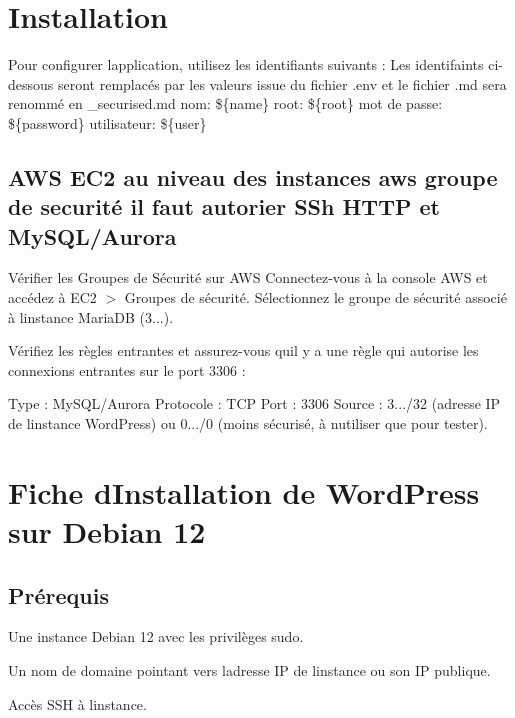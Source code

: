 \section*{Installation}

Pour configurer l\textquotesingle{}application, utilisez les identifiants suivants \+: Les identifaints ci-\/dessous seront remplacés par les valeurs issue du fichier .env et le fichier .md sera renommé en \+\_\+securised.\+md nom\+: \$\{name\} root\+: \$\{root\} mot de passe\+: \$\{password\} utilisateur\+: \$\{user\}

\subsection*{A\+WS E\+C2 au niveau des instances aws groupe de securité il faut autorier S\+Sh H\+T\+TP et My\+S\+Q\+L/\+Aurora}

Vérifier les Groupes de Sécurité sur A\+WS Connectez-\/vous à la console A\+WS et accédez à E\+C2 $>$ Groupes de sécurité. Sélectionnez le groupe de sécurité associé à l\textquotesingle{}instance Maria\+DB (3...).

Vérifiez les règles entrantes et assurez-\/vous qu\textquotesingle{}il y a une règle qui autorise les connexions entrantes sur le port 3306 \+:

Type \+: My\+S\+Q\+L/\+Aurora Protocole \+: T\+CP Port \+: 3306 Source \+: 3.../32 (adresse IP de l\textquotesingle{}instance Word\+Press) ou 0.../0 (moins sécurisé, à n\textquotesingle{}utiliser que pour tester).

\section*{Fiche d\textquotesingle{}Installation de Word\+Press sur Debian 12}

\subsection*{Prérequis}


\begin{DoxyItemize}
\item Une instance Debian 12 avec les privilèges {\ttfamily sudo}.
\item Un nom de domaine pointant vers l\textquotesingle{}adresse IP de l\textquotesingle{}instance ou son IP publique.
\item Accès S\+SH à l\textquotesingle{}instance.
\end{DoxyItemize}


